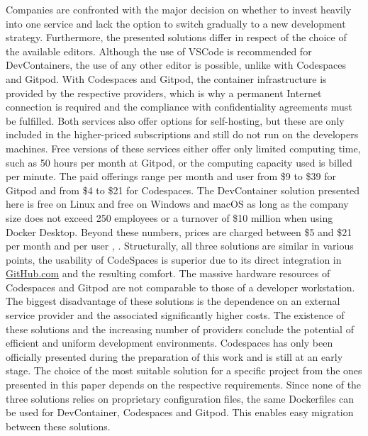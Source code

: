        Companies are confronted with the major decision on whether to invest heavily into one service and lack the option to switch gradually to a new development strategy.\newline
        Furthermore, the presented solutions differ in respect of the choice of the available editors. Although the use of \ac{VSCode} is recommended for DevContainers, the use of any other editor is possible, unlike with Codespaces and Gitpod. With Codespaces and Gitpod, the container infrastructure is provided by the respective providers, which is why a permanent Internet connection is required and the compliance with confidentiality agreements must be fulfilled. Both services also offer options for self-hosting, but these are only included in the higher-priced subscriptions and still do not run on the developers machines. Free versions of these services either offer only limited computing time, such as 50 hours per month at Gitpod, or the computing capacity used is billed per minute. The paid offerings range per month and user from \$9 to \$39 for Gitpod and from \$4 to \$21 for Codespaces. The DevContainer solution presented here is free on Linux and free on Windows and macOS as long as the company size does not exceed 250 employees or a turnover of \$10 million when using Docker Desktop. Beyond these numbers, prices are charged between \$5 and \$21 per month and per user \cite{gitpod}, \cite{githubblogcodespace}.\newline
        Structurally, all three solutions are similar in various points, the usability of CodeSpaces is superior due to its direct integration in \href{https://www.GitHub.com}{GitHub.com} and the resulting comfort. The massive hardware resources of Codespaces and Gitpod are not comparable to those of a developer workstation. The biggest disadvantage of these solutions is the dependence on an external service provider and the associated significantly higher costs. The existence of these solutions and the increasing number of providers conclude the potential of efficient and uniform development environments. Codespaces has only been officially presented during the preparation of this work and is still at an early stage.
        The choice of the most suitable solution for a specific project from the ones presented in this paper depends on the respective requirements. Since none of the three solutions relies on proprietary configuration files, the same Dockerfiles can be used for DevContainer, Codespaces and Gitpod. This enables easy migration between these solutions.

